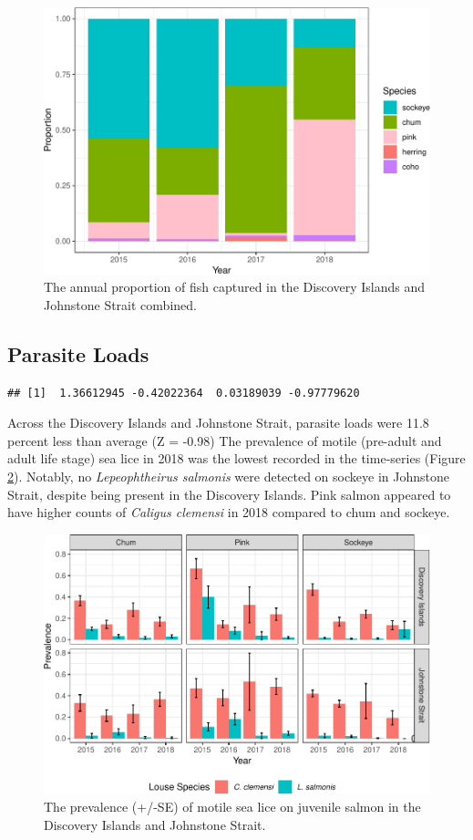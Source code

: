 \documentclass[fleqn,10pt]{wlpeerj} %
\begin{document}
\begin{figure}[H]
\includegraphics[width=0.8\linewidth]{peer_j_migration_dynamics_files/figure-latex/prop-1} \caption{The annual proportion of fish captured in the Discovery Islands and Johnstone Strait combined.}\label{fig:prop}
\end{figure}

\subsection*{Parasite Loads}\label{parasite-loads}

\begin{verbatim}
## [1]  1.36612945 -0.42022364  0.03189039 -0.97779620
\end{verbatim}

Across the Discovery Islands and Johnstone Strait, parasite loads were
11.8 percent less than average (Z = -0.98) The prevalence of motile
(pre-adult and adult life stage) sea lice in 2018 was the lowest
recorded in the time-series (Figure \ref{fig:sealice}). Notably, no
\emph{Lepeophtheirus salmonis} were detected on sockeye in Johnstone
Strait, despite being present in the Discovery Islands. Pink salmon
appeared to have higher counts of \emph{Caligus clemensi} in 2018
compared to chum and sockeye.

\begin{figure}[H]
\includegraphics[width=0.8\linewidth]{peer_j_migration_dynamics_files/figure-latex/sealice-1} \caption{The prevalence (+/-SE) of motile sea lice on juvenile salmon in the Discovery Islands and Johnstone Strait.}\label{fig:sealice}
\end{figure}
\end{document}
